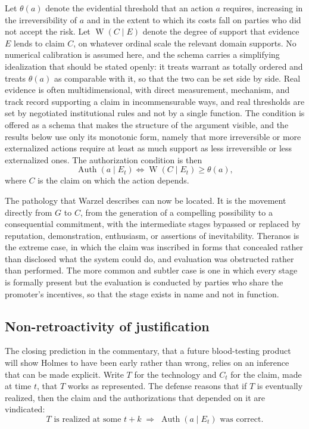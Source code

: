 \documentclass[11pt]{article}
\theoremstyle{plain}
\theoremstyle{definition}
\theoremstyle{remark}
\newcommand{\Auth}{\operatorname{Auth}}
\newcommand{\Warr}{\operatorname{W}}
\begin{document}
Let $\theta(a)$ denote the evidential threshold that an action $a$ requires, increasing in the irreversibility of $a$ and in the extent to which its costs fall on parties who did not accept the risk. Let $\Warr(C \mid E)$ denote the degree of support that evidence $E$ lends to claim $C$, on whatever ordinal scale the relevant domain supports. No numerical calibration is assumed here, and the schema carries a simplifying idealization that should be stated openly: it treats warrant as totally ordered and treats $\theta(a)$ as comparable with it, so that the two can be set side by side. Real evidence is often multidimensional, with direct measurement, mechanism, and track record supporting a claim in incommensurable ways, and real thresholds are set by negotiated institutional rules and not by a single function. The condition is offered as a schema that makes the structure of the argument visible, and the results below use only its monotonic form, namely that more irreversible or more externalized actions require at least as much support as less irreversible or less externalized ones. The authorization condition is then
\[
\Auth(a \mid E_t) \iff \Warr(C \mid E_t) \ge \theta(a),
\]
where $C$ is the claim on which the action depends.

The pathology that Warzel describes can now be located. It is the movement directly from $G$ to $C$, from the generation of a compelling possibility to a consequential commitment, with the intermediate stages bypassed or replaced by reputation, demonstration, enthusiasm, or assertions of inevitability. Theranos is the extreme case, in which the claim was inscribed in forms that concealed rather than disclosed what the system could do, and evaluation was obstructed rather than performed. The more common and subtler case is one in which every stage is formally present but the evaluation is conducted by parties who share the promoter's incentives, so that the stage exists in name and not in function.

\subsection{Non-retroactivity of justification}

The closing prediction in the commentary, that a future blood-testing product will show Holmes to have been early rather than wrong, relies on an inference that can be made explicit. Write $T$ for the technology and $C_t$ for the claim, made at time $t$, that $T$ works as represented. The defense reasons that if $T$ is eventually realized, then the claim and the authorizations that depended on it are vindicated:
\[
\text{$T$ is realized at some $t+k$} \;\Longrightarrow\; \Auth(a \mid E_t) \text{ was correct.}
\]
\end{document}
